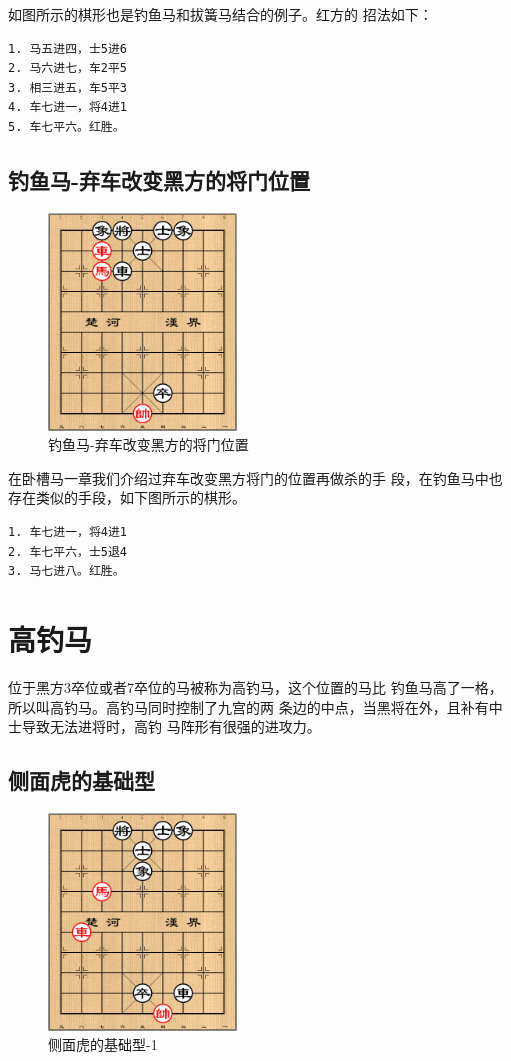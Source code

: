 \documentclass[a5paper,twoside]{book}
\begin{document}
如图所示的棋形也是钓鱼马和拔簧马结合的例子。红方的
招法如下：
\begin{verbatim}
1. 马五进四，士5进6
2. 马六进七，车2平5
3. 相三进五，车5平3
4. 车七进一，将4进1
5. 车七平六。红胜。
\end{verbatim}

\section{钓鱼马-弃车改变黑方的将门位置}
\label{sec-3-7}
\begin{figure}[H]
\centering
\includegraphics[width=5cm]{pic/钓鱼马-弃车改变黑方的将门位置.png}
\caption{钓鱼马-弃车改变黑方的将门位置}
\end{figure}

在卧槽马一章我们介绍过弃车改变黑方将门的位置再做杀的手
段，在钓鱼马中也存在类似的手段，如下图所示的棋形。

\begin{verbatim}
1. 车七进一，将4进1
2. 车七平六，士5退4
3. 马七进八。红胜。
\end{verbatim}



\chapter{高钓马}
\label{sec-4}
位于黑方3卒位或者7卒位的马被称为高钓马，这个位置的马比
钓鱼马高了一格，所以叫高钓马。高钓马同时控制了九宫的两
条边的中点，当黑将在外，且补有中士导致无法进将时，高钓
马阵形有很强的进攻力。

\section{侧面虎的基础型}
\label{sec-4-1}
\begin{figure}[H]
\centering
\includegraphics[width=5cm]{pic/侧面虎的基础型.png}
\caption{\label{cmhjcx1}侧面虎的基础型-1}
\end{figure}
\end{document}
